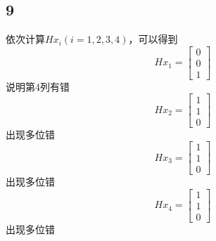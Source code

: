 \documentclass[twocolumn]{article}
\newenvironment{SChinese}{
	\CJKfamily{gbsn}
	\CJKtilde
	\CJKnospace}{}
\begin{document}
\begin{CJK}{UTF8}{}
\begin{SChinese}
			\subsection*{9}
				依次计算$Hx_i(i=1,2,3,4)$，可以得到\begin{displaymath}
					Hx_1=\left [\begin{matrix} 0 \\ 0 \\ 1 \end{matrix}\right]
				\end{displaymath}
				说明第4列有错
				\begin{displaymath}
				Hx_2=\left [\begin{matrix} 1 \\ 1 \\ 0 \end{matrix}\right]
				\end{displaymath}
				出现多位错
				\begin{displaymath}
				Hx_3=\left [\begin{matrix} 1 \\ 1 \\ 0 \end{matrix}\right]
				\end{displaymath}
				出现多位错
				\begin{displaymath}
				Hx_4=\left [\begin{matrix} 1 \\ 1 \\ 0 \end{matrix}\right]
				\end{displaymath}
				出现多位错

\end{SChinese}
\end{CJK}
\end{document}
